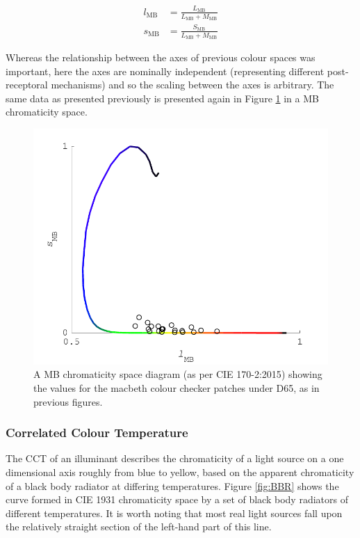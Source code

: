 \begin{subequations}
\begin{align}
l_{\text{MB}}&= \frac{L_{\text{MB}}}{L_{\text{MB}}+M_{\text{MB}}} \\ 
s_{\text{MB}}&= \frac{S_{\text{MB}}}{L_{\text{MB}}+M_{\text{MB}}} 
\end{align}
\label{eq:MB}
\end{subequations}

Whereas the relationship between the axes of previous colour spaces was important, here the axes are nominally independent (representing different post-receptoral mechanisms) and so the scaling between the axes is arbitrary. The same data as presented previously is presented again in Figure \ref{fig:lrMB} in a \gls{MB} chromaticity space.

\begin{figure}[htbp]
\includegraphics[max width=\textwidth]{figs/LitRev/ColorimetryDemo5.pdf}
\caption{A \gls{MB} chromaticity space diagram (as per \gls{CIE} 170-2:2015\citep{cie_cie_2015}) showing the values for the macbeth colour checker patches under D65, as in previous figures.}
\label{fig:lrMB}
\end{figure}

\subsubsection{Correlated Colour Temperature}

The \acrfull{CCT} of an illuminant describes the chromaticity of a light source on a one dimensional axis roughly from blue to yellow, based on the apparent chromaticity of a black body radiator at differing temperatures. Figure \ref{fig:BBR} shows the curve formed in \gls{CIE} 1931 chromaticity space by a set of black body radiators of different temperatures. It is worth noting that most real light sources fall upon the relatively straight section of the left-hand part of this line.

